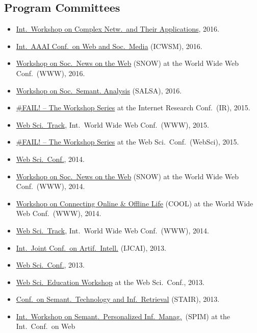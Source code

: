 \documentclass[line,margin]{res}
\newcounter{x}
\begin{document}
\begin{resume}
\section{Program Committees}
\begin{itemize}
\item \href{http://complexnetworks.org/index2016.html}{Int.\ Workshop on
  Complex Netw.\ and Their Applications}, 2016.  
\item \href{http://www.icwsm.org/2016/index.php}{Int.\ AAAI Conf.\ on
  Web and Soc.\ Media} (ICWSM), 2016.
\item \href{http://www.snow-workshop.org/}{Workshop on Soc.\ News on
  the Web} (SNOW) at the World Wide Web Conf.\ (WWW), 2016. 
\item \href{http://events.kmi.open.ac.uk/salsa2016/}{Workshop on Soc.\ Semant. Analysis} (SALSA), 2016.
\item \href{https://failworkshops.wordpress.com/fail-at-ir16/}{\#FAIL!
  -- The Workshop Series} at the Internet Research Conf.\ (IR), 2015.
\item \href{http://www.www2015.it/call-for-web-science-track/}{Web
  Sci.\ Track}, Int.\ World Wide Web Conf.\ (WWW), 2015.
\item \href{https://failworkshops.wordpress.com/fail-workshop-at-websci15/}{\#FAIL! -- The Workshop Series} at the Web Sci.\ Conf.\ (WebSci), 2015.
\item \href{http://www.websci14.org/}{Web Sci.\ Conf.},
  2014. 
\item \href{http://www.snow-workshop.org/}{Workshop on Soc.\ News on
  the Web} (SNOW) at the World Wide Web Conf.\ (WWW), 2014.
\item \href{http://www.cool2014.com/}{Workshop on Connecting Online \&
  Offline Life} (COOL) at the World Wide Web Conf.\ (WWW), 2014. 
\item \href{http://www2014.kr/calls/call-for-web-science-track/}{Web
  Sci.\ Track}, Int.\ World Wide Web Conf.\ (WWW), 2014.
\item \href{http://ijcai13.org/}{Int.\ Joint Conf.\ on Artif.\ Intell.} (IJCAI), 2013.  
\item \href{http://www.websci13.org/}{Web Sci.\ Conf.}, 2013. 
\item \href{http://webscience-education-workshop.blogs.usj.edu.lb/}{Web
  Sci.\ Education Workshop} at the Web Sci.\ Conf., 2013. 
\item \href{http://www.ftsm.ukm.my/stair13/}{Conf.\ on Semant.\ Technology and Inf.\ Retrieval} (STAIR), 2013. 
\item \href{http://spim-workshop.org/}{Int.\ Workshop on Semant.\ Personalized Inf.\ Manag.}\ (SPIM) at the Int.\ Conf.\ on Web

\end{itemize}
\end{resume}
\end{document}

